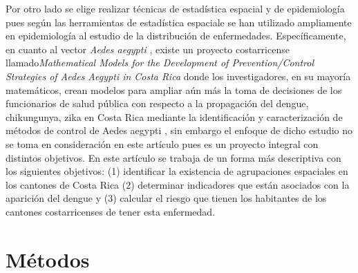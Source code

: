 \documentclass[12pt,a4paper]{article}
\begin{document}
Por otro lado se elige realizar técnicas de estadística espacial y de epidemiología pues según \cite{sp} las herramientas de estadística espaciale se han utilizado ampliamente en epidemiología al estudio de la distribución de enfermedades. Específicamente, en cuanto al vector \textit{Aedes aegypti} , existe un proyecto costarricense llamado\textit{Mathematical Models for the Development of Prevention/Control Strategies of Aedes Aegypti in Costa Rica} donde los investigadores, en su mayoría matemáticos, crean modelos para ampliar aún más la toma de decisiones de los funcionarios de salud pública con respecto a la propagación del dengue, chikungunya, zika en Costa Rica mediante la identificación y caracterización de métodos de control de Aedes aegypti \cite{ucrea}, sin embargo el enfoque de dicho estudio no se toma en consideración en este artículo pues es un proyecto integral con distintos objetivos. En este artículo se trabaja de un forma más descriptiva con los siguientes objetivos: (1) identificar la existencia de agrupaciones espaciales en los cantones de Costa Rica (2) determinar indicadores que están asociados con la aparición del dengue y (3) calcular el riesgo que tienen los habitantes de los cantones costarricenses de tener esta enfermedad.
\section{Métodos}
\end{document}
